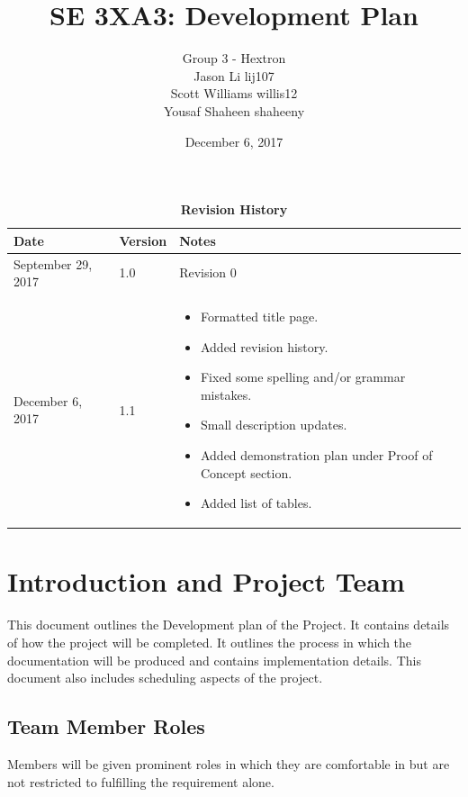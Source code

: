\documentclass[12pt]{article}
\title{SE 3XA3: Development Plan}
\author{Group 3 - Hextron
		\\ Jason Li lij107
		\\ Scott Williams willis12
		\\ Yousaf Shaheen shaheeny
}
\date{December 6, 2017}
\begin{document}
\maketitle

\newpage
\tableofcontents
\listoftables
\newpage

\begin{table}[]
\caption{\bf Revision History}
\begin{tabularx}{\textwidth}{p{3cm}p{2cm}X}
\toprule {\bf Date} & {\bf Version} & {\bf Notes}\\
\midrule
September 29, 2017 & 1.0 & Revision 0 \\ \hline
December 6, 2017 & 1.1 & \begin{itemize}[leftmargin=0cm,itemindent=.5cm,labelwidth=\itemindent,labelsep=0cm,align=left,itemsep = 0mm,nosep]


  \item Formatted title page.
  \item Added revision history.
  \item Fixed some spelling and/or grammar mistakes.
  \item Small description updates.
  \item Added demonstration plan under Proof of Concept section.
  \item Added list of tables.
  
\end{itemize} \\
\bottomrule
\end{tabularx}
\end{table}
\vspace*{\fill}

\newpage

\section{Introduction and Project Team}
This document outlines the Development plan of the Project. It contains details of how the project will be completed. It outlines the process in which the documentation will be produced and contains implementation details. This document also includes scheduling aspects of the project.


\subsection{Team Member Roles}
Members will be given prominent roles in which they are comfortable in but are not restricted to fulfilling the requirement alone.\\
\end{document}

